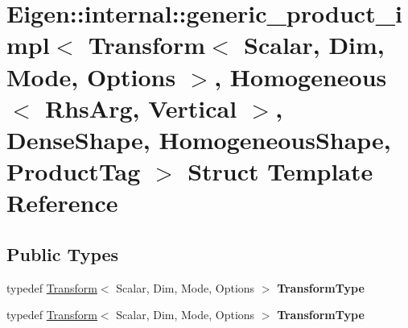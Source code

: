 \hypertarget{struct_eigen_1_1internal_1_1generic__product__impl_3_01_transform_3_01_scalar_00_01_dim_00_01_mo9dee7991850e2cedf8646fca36129af2}{}\section{Eigen\+:\+:internal\+:\+:generic\+\_\+product\+\_\+impl$<$ Transform$<$ Scalar, Dim, Mode, Options $>$, Homogeneous$<$ Rhs\+Arg, Vertical $>$, Dense\+Shape, Homogeneous\+Shape, Product\+Tag $>$ Struct Template Reference}
\label{struct_eigen_1_1internal_1_1generic__product__impl_3_01_transform_3_01_scalar_00_01_dim_00_01_mo9dee7991850e2cedf8646fca36129af2}
\subsection*{Public Types}
\begin{DoxyCompactItemize}
\item 
\mbox{\label{struct_eigen_1_1internal_1_1generic__product__impl_3_01_transform_3_01_scalar_00_01_dim_00_01_mo9dee7991850e2cedf8646fca36129af2_afd08afc85d6796cb4200d5947afb5fd8}} 
typedef \hyperlink{group___geometry___module_class_eigen_1_1_transform}{Transform}$<$ Scalar, Dim, Mode, Options $>$ {\bfseries Transform\+Type}
\item 
\mbox{\label{struct_eigen_1_1internal_1_1generic__product__impl_3_01_transform_3_01_scalar_00_01_dim_00_01_mo9dee7991850e2cedf8646fca36129af2_afd08afc85d6796cb4200d5947afb5fd8}} 
typedef \hyperlink{group___geometry___module_class_eigen_1_1_transform}{Transform}$<$ Scalar, Dim, Mode, Options $>$ {\bfseries Transform\+Type}
\end{DoxyCompactItemize}
